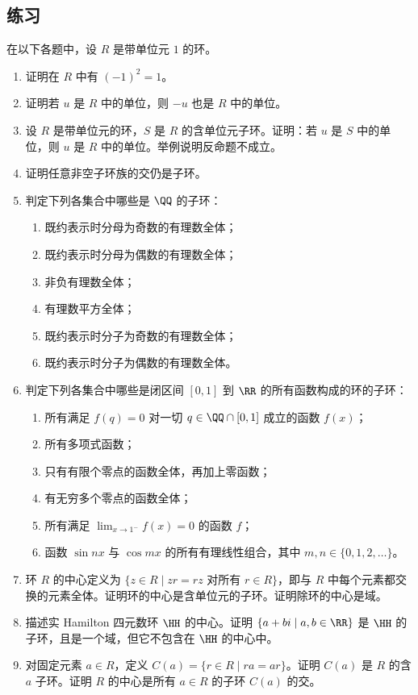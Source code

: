 \subsection*{练习}
在以下各题中，设 $R$ 是带单位元 $1$ 的环。
\begin{enumerate}[label=\arabic*.]
	\item 证明在 $R$ 中有 $(-1)^2=1$。
	\item 证明若 $u$ 是 $R$ 中的单位，则 $-u$ 也是 $R$ 中的单位。
	\item 设 $R$ 是带单位元的环，$S$ 是 $R$ 的含单位元子环。证明：若 $u$ 是 $S$ 中的单位，则 $u$ 是 $R$ 中的单位。举例说明反命题不成立。
	\item 证明任意非空子环族的交仍是子环。
	\item 判定下列各集合中哪些是 $\QQ$ 的子环：
	\begin{enumerate}[label=(\alph*)]
		\item 既约表示时分母为奇数的有理数全体；
		\item 既约表示时分母为偶数的有理数全体；
		\item 非负有理数全体；
		\item 有理数平方全体；
		\item 既约表示时分子为奇数的有理数全体；
		\item 既约表示时分子为偶数的有理数全体。
	\end{enumerate}
	\item 判定下列各集合中哪些是闭区间 $[0,1]$ 到 $\RR$ 的所有函数构成的环的子环：
	\begin{enumerate}[label=(\alph*)]
		\item 所有满足 $f(q)=0$ 对一切 $q\in\QQ\cap[0,1]$ 成立的函数 $f(x)$；
		\item 所有多项式函数；
		\item 只有有限个零点的函数全体，再加上零函数；
		\item 有无穷多个零点的函数全体；
		\item 所有满足 $\lim_{x\to1^-}f(x)=0$ 的函数 $f$；
		\item 函数 $\sin nx$ 与 $\cos mx$ 的所有有理线性组合，其中 $m,n\in\{0,1,2,\ldots\}$。
	\end{enumerate}
	\item 环 $R$ 的中心定义为 $\{z\in R\mid zr=rz\text{ 对所有 }r\in R\}$，即与 $R$ 中每个元素都交换的元素全体。证明环的中心是含单位元的子环。证明除环的中心是域。
	\item 描述实 Hamilton 四元数环 $\HH$ 的中心。证明 $\{a+bi\mid a,b\in\RR\}$ 是 $\HH$ 的子环，且是一个域，但它不包含在 $\HH$ 的中心中。
	\item 对固定元素 $a\in R$，定义 $C(a)=\{r\in R\mid ra=ar\}$。证明 $C(a)$ 是 $R$ 的含 $a$ 子环。证明 $R$ 的中心是所有 $a\in R$ 的子环 $C(a)$ 的交。

\end{enumerate}
